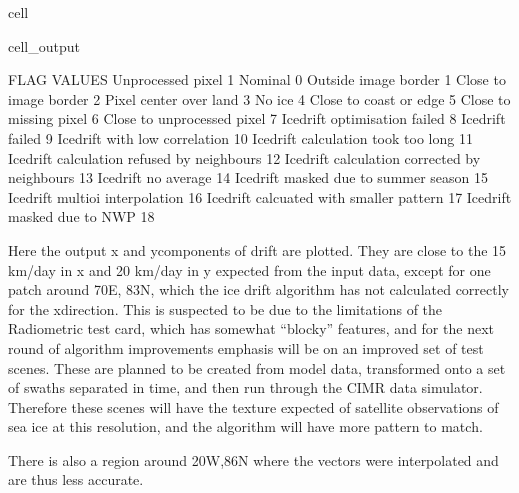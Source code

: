 \documentclass[letterpaper,10pt,english]{jupyterBook}
\begin{document}
\begin{sphinxuseclass}{cell}
\begin{sphinxVerbatimOutput}
\begin{sphinxuseclass}{cell_output}
\noindent{}

\begin{sphinxVerbatim}[commandchars=\\\{\}]
FLAG VALUES 
Unprocessed pixel                              \PYGZhy{}1
Nominal                                        0
Outside image border                           1
Close to image border                          2
Pixel center over land                         3
No ice                                         4
Close to coast or edge                         5
Close to missing pixel                         6
Close to unprocessed pixel                     7
Icedrift optimisation failed                   8
Icedrift failed                                9
Icedrift with low correlation                  10
Icedrift calculation took too long             11
Icedrift calculation refused by neighbours     12
Icedrift calculation corrected by neighbours   13
Icedrift no average                            14
Icedrift masked due to summer season           15
Icedrift multi\PYGZhy{}oi interpolation                16
Icedrift calcuated with smaller pattern        17
Icedrift masked due to NWP                     18
\end{sphinxVerbatim}

\end{sphinxuseclass}\end{sphinxVerbatimOutput}

\end{sphinxuseclass}
\sphinxAtStartPar
Here the output x\sphinxhyphen{} and y\sphinxhyphen{}components of drift are plotted. They are close to the 15 km/day in x and 20 km/day in y expected from the input data, except for one patch around 70E, 83N, which the ice drift algorithm has not calculated correctly for the x\sphinxhyphen{}direction. This is suspected to be due to the limitations of the Radiometric test card, which has somewhat “blocky” features, and for the next round of algorithm improvements emphasis will be on an improved set of test scenes. These are planned to be created from model data, transformed onto a set of swaths separated in time, and then run through the CIMR data simulator. Therefore these scenes will have the texture expected of satellite observations of sea ice at this resolution, and the algorithm will have more pattern to match.

\sphinxAtStartPar
There is also a region around 20W,86N where the vectors were interpolated and are thus less accurate.
\end{document}
